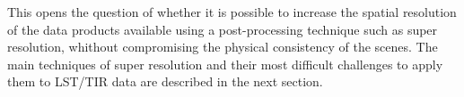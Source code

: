         This opens the question of whether it is possible to increase the spatial resolution of the data products available using a post-processing technique such as super resolution, whithout compromising the physical consistency of the scenes.
        The main techniques of super resolution and their most difficult challenges to apply them to LST/TIR data are described in the next section.

\newpage